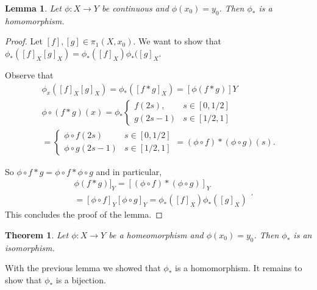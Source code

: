 \documentclass[11pt,letterpaper,boxed]{article}
\newtheorem*{theorem}{Theorem}
\newtheorem*{lemma}{Lemma}
\begin{document}
\begin{lemma} Let $\phi:X\to Y$ be continuous and $\phi(x_0)=y_0$.  Then $\phi_*$ is a homomorphism.
\end{lemma}
\begin{proof} Let $[f],[g]\in \pi_1(X,x_0).$  We want to show that $\phi_*([f]_X[g]_X)=\phi_*([f]_X)\phi_*([g]_X$.

Observe that \[\begin{array}{c}
\phi_x([f]_X[g]_X)=\phi_*([f*g]_X)=[\phi(f*g)]Y\\
\phi\circ (f*g)(x)=\phi_*\begin{cases} f(2s), &s\in [0,1/2]\\ g(2s-1) & s\in [1/2,1]
\end{cases}\\
= \begin{cases} \phi\circ f(2s) & s\in [0,1/2]\\ \phi\circ g(2s-1) & s\in [1/2,1]\end{cases}=(\phi\circ f)*(\phi\circ g)(s).
\end{array}\]

So $\phi\circ f * g=\phi\circ f * \phi\circ g$ and in particular, \[ \begin{array}{cc}  & \phi(f*g)]_Y  =[(\phi\circ f)*(\phi\circ g)]_Y\\ & =[\phi\circ f]_Y[\phi\circ g]_Y=\phi_*([f]_X)\phi_*([g]_X)\end{array}.\]  This concludes the proof of the lemma.

\end{proof}

\vspace{.3in}
\begin{theorem}
Let $\phi:X\to Y$ be a homeomorphism and $\phi(x_0)=y_0$.  Then $\phi_*$ is an isomorphism.
\end{theorem}

With the previous lemma we showed that $\phi_*$ is a homomorphism.  It remains to show that $\phi_*$ is a bijection.
\end{document}
